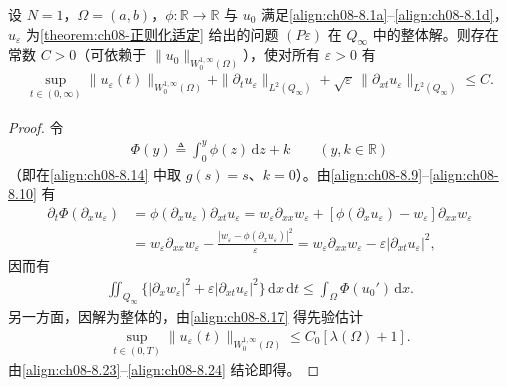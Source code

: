 \documentclass[../../main.tex]{subfiles}%
\begin{document}
\begin{proposition}[$N=1$ 的先验估计]\label{proposition:ch08-先验估计N1}
设 $N=1$，$\Omega=(a,b)$，$\phi:\mathbb{R}\to\mathbb{R}$ 与 $u_0$ 满足\eqref{align:ch08-8.1a}--\eqref{align:ch08-8.1d}，$u_\varepsilon$ 为\cref{theorem:ch08-正则化适定} 给出的问题 $(P\varepsilon)$ 在 $Q_\infty$ 中的整体解。则存在常数 $C>0$（可依赖于 $\|u_0\|_{W^{1,\infty}_0(\Omega)}$），使对所有 $\varepsilon>0$ 有
\begin{align}
\sup_{t\in(0,\infty)}\|u_\varepsilon(t)\|_{W^{1,\infty}_0(\Omega)}
+\|\partial_t u_\varepsilon\|_{L^2(Q_\infty)}
+\sqrt{\varepsilon}\,\|\partial_{xt}u_\varepsilon\|_{L^2(Q_\infty)}\leqslant C. \label{align:ch08-8.21}
\end{align}
\end{proposition}

\begin{proof}
令
\begin{align}
\Phi(y)\triangleq \int_0^y\phi(z)\,\mathrm{d}z+k\qquad(y,k\in\mathbb{R}) \label{align:ch08-8.22}
\end{align}
（即在\eqref{align:ch08-8.14} 中取 $g(s)=s$、$k=0$）。由\eqref{align:ch08-8.9}--\eqref{align:ch08-8.10} 有
\begin{align*}
\partial_t\Phi(\partial_x u_\varepsilon)
&=\phi(\partial_x u_\varepsilon)\partial_{xt}u_\varepsilon
=w_\varepsilon\partial_{xx}w_\varepsilon+[\phi(\partial_x u_\varepsilon)-w_\varepsilon]\partial_{xx}w_\varepsilon\\
&=w_\varepsilon\partial_{xx}w_\varepsilon-\frac{|w_\varepsilon-\phi(\partial_x u_\varepsilon)|^2}{\varepsilon}
=w_\varepsilon\partial_{xx}w_\varepsilon-\varepsilon|\partial_{xt}u_\varepsilon|^2,
\end{align*}
因而有
\begin{align}
\iint_{Q_\infty}\{|\partial_x w_\varepsilon|^2+\varepsilon|\partial_{xt}u_\varepsilon|^2\}\,\mathrm{d}x\,\mathrm{d}t
\leqslant\int_\Omega\Phi(u_0')\,\mathrm{d}x. \label{align:ch08-8.23}
\end{align}
另一方面，因解为整体的，由\eqref{align:ch08-8.17} 得先验估计
\begin{align}
\sup_{t\in(0,T)}\|u_\varepsilon(t)\|_{W^{1,\infty}_0(\Omega)}\leqslant C_0[\lambda(\Omega)+1]. \label{align:ch08-8.24}
\end{align}
由\eqref{align:ch08-8.23}--\eqref{align:ch08-8.24} 结论即得。
\end{proof}
\end{document}
